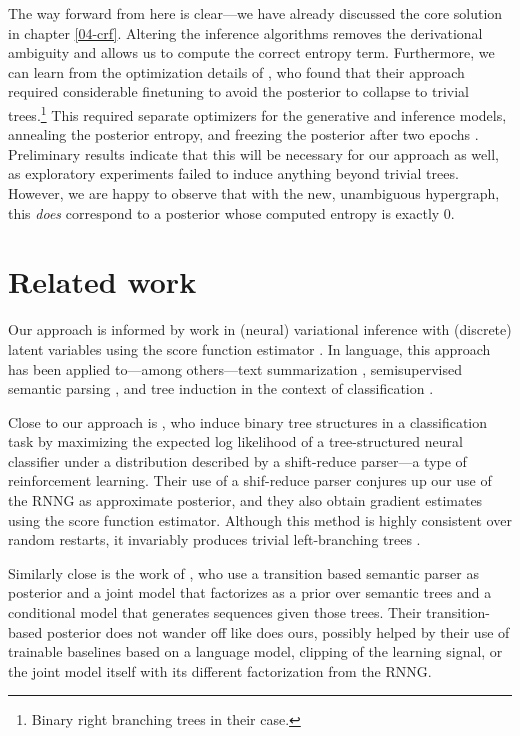     The way forward from here is clear---we have already discussed the core solution in chapter \ref{04-crf}. Altering the inference algorithms removes the derivational ambiguity and allows us to compute the correct entropy term. Furthermore, we can learn from the optimization details of \citet{kim2019unsupervised}, who found that their approach required considerable finetuning to avoid the posterior to collapse to trivial trees.\footnote{Binary right branching trees in their case.} This required separate optimizers for the generative and inference models, annealing the posterior entropy, and freezing the posterior after two epochs \citep{kim2019unsupervised}. Preliminary results indicate that this will be necessary for our approach as well, as exploratory experiments failed to induce anything beyond trivial trees. However, we are happy to observe that with the new, unambiguous hypergraph, this \textit{does} correspond to a posterior whose computed entropy is exactly 0.

\section{Related work}
  Our approach is informed by work in (neural) variational inference with (discrete) latent variables using the score function estimator \citep{paisley2012viss,mnih2014nvil,ranganath2014black,mnih2016variational}. In language, this approach has been applied to---among others---text summarization \citep{miao2016discrete}, semisupervised semantic parsing \citep{yin2018structvae}, and tree induction in the context of classification \citep{yogatama2016reinforcement}.

  Close to our approach is \citet{yogatama2016reinforcement}, who induce binary tree structures in a classification task by maximizing the expected log likelihood of a tree-structured neural classifier under a distribution described by a shift-reduce parser---a type of reinforcement learning. Their use of a shif-reduce parser conjures up our use of the RNNG as approximate posterior, and they also obtain gradient estimates using the score function estimator. Although this method is highly consistent over random restarts, it invariably produces trivial left-branching trees \citep{williams2018latent}.

  Similarly close is the work of \cite{yin2018structvae}, who use a transition based semantic parser as posterior and a joint model that factorizes as a prior over semantic trees and a conditional model that generates sequences given those trees. Their transition-based posterior does not wander off like does ours, possibly helped by their use of trainable baselines based on a language model, clipping of the learning signal, or the joint model itself with its different factorization from the RNNG.

